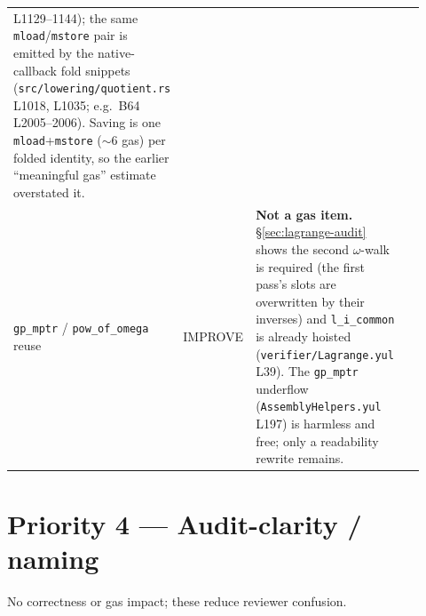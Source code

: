 \begin{center}
\begin{tabular}{@{}p{0.19\linewidth}p{0.10\linewidth}p{0.45\linewidth}p{0.18\linewidth}@{}}
L1129--1144); the same
\texttt{mload}/\texttt{mstore} pair is emitted by the native-callback
fold snippets (\texttt{src/\allowbreak{}lowering/\allowbreak{}quotient.rs} L1018, L1035; e.g.\
B64 L2005--2006). Saving is one \texttt{mload}+\texttt{mstore}
($\sim$6 gas) per folded identity, so the earlier ``meaningful gas''
estimate overstated it. &
\vstatus{OPEN} \\
\addlinespace
\texttt{gp\_mptr} / \texttt{pow\_of\_omega} reuse &
\textcolor{codegenblue}{IMPROVE} &
\textbf{Not a gas item.} \S\ref{sec:lagrange-audit} shows the second
$\omega$-walk is required (the first pass's slots are overwritten by
their inverses) and \texttt{l\_i\_common} is already hoisted
(\texttt{verifier/\allowbreak{}Lagrange.yul} L39). The \texttt{gp\_mptr} underflow
(\texttt{AssemblyHelpers.yul} L197) is harmless and free; only a
readability rewrite remains. &
\vstatus{CORRECTED} \\
\bottomrule
\end{tabular}
\end{center}

\section{Priority 4 --- Audit-clarity / naming}
\label{sec:roadmap-p4}

No correctness or gas impact; these reduce reviewer confusion.

